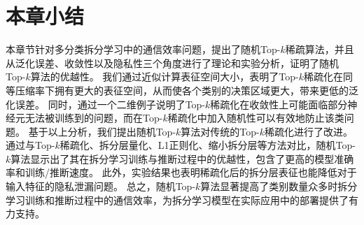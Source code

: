 \section{本章小结}
本章节针对多分类拆分学习中的通信效率问题，提出了随机Top-$k$稀疏算法，并且从泛化误差、收敛性以及隐私性三个角度进行了理论和实验分析，证明了随机Top-$k$算法的优越性。
%
我们通过近似计算表征空间大小，表明了Top-$k$稀疏化在同等压缩率下拥有更大的表征空间，从而使各个类别的决策区域更大，带来更低的泛化误差。
%
同时，通过一个二维例子说明了Top-$k$稀疏化在收敛性上可能面临部分神经元无法被训练到的问题，而在Top-$k$稀疏化中加入随机性可以有效地防止该类问题。
%
基于以上分析，我们提出随机Top-$k$算法对传统的Top-$k$稀疏化进行了改进。
%
通过与Top-$k$稀疏化、拆分层量化、L1正则化、缩小拆分层等方法对比，随机Top-$k$算法显示出了其在拆分学习训练与推断过程中的优越性，包含了更高的模型准确率和训练/推断速度。
%
此外，实验结果也表明稀疏化后的拆分层表征也能降低对于输入特征的隐私泄漏问题。
%
总之，随机Top-$k$算法显著提高了类别数量众多时拆分学习训练和推断过程中的通信效率，为拆分学习模型在实际应用中的部署提供了有力支持。
